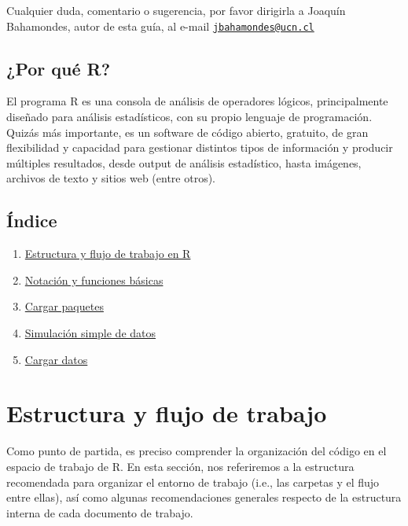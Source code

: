 \documentclass[
]{book}
\providecommand{\tightlist}{%
  \setlength{\itemsep}{0pt}\setlength{\parskip}{0pt}}
\begin{document}
Cualquier duda, comentario o sugerencia, por favor dirigirla a Joaquín Bahamondes, autor de esta guía, al e-mail \href{mailto:jbahamondes@ucn.cl}{\nolinkurl{jbahamondes@ucn.cl}}

\hypertarget{por-quuxe9-r}{%
\section*{¿Por qué R?}\label{por-quuxe9-r}}

El programa R es una consola de análisis de operadores lógicos, principalmente diseñado para análisis estadísticos, con su propio lenguaje de programación. Quizás más importante, es un software de código abierto, gratuito, de gran flexibilidad y capacidad para gestionar distintos tipos de información y producir múltiples resultados, desde output de análisis estadístico, hasta imágenes, archivos de texto y sitios web (entre otros).

\hypertarget{uxedndice}{%
\section*{Índice}\label{uxedndice}}

\begin{enumerate}
\def\labelenumi{\arabic{enumi}.}
\tightlist
\item
  \protect\hyperlink{estructura-flujo}{Estructura y flujo de trabajo en R}\\
\item
  \protect\hyperlink{notacion-funciones}{Notación y funciones básicas}\\
\item
  \protect\hyperlink{paquetes}{Cargar paquetes}\\
\item
  \protect\hyperlink{simulaciuxf3n}{Simulación simple de datos}\\
\item
  \protect\hyperlink{carga-datos}{Cargar datos}
\end{enumerate}

\hypertarget{estructura-flujo}{%
\chapter{Estructura y flujo de trabajo}\label{estructura-flujo}}

Como punto de partida, es preciso comprender la organización del código en el espacio de trabajo de R. En esta sección, nos referiremos a la estructura recomendada para organizar el entorno de trabajo (i.e., las carpetas y el flujo entre ellas), así como algunas recomendaciones generales respecto de la estructura interna de cada documento de trabajo.
\end{document}
